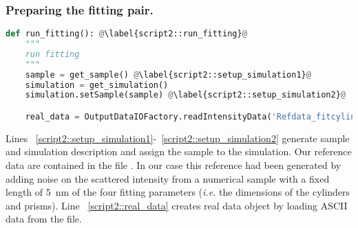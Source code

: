 \subsubsection*{Preparing the fitting pair.}
\begin{lstlisting}[language=python, style=eclipseboxed, firstnumber=45]
def run_fitting(): @\label{script2::run_fitting}@
    """
    run fitting
    """
    sample = get_sample() @\label{script2::setup_simulation1}@
    simulation = get_simulation()
    simulation.setSample(sample) @\label{script2::setup_simulation2}@

    real_data = OutputDataIOFactory.readIntensityData('Refdata_fitcylinderprisms.txt') @\label{script2::real_data}@
\end{lstlisting}
Lines ~\ref{script2::setup_simulation1}-~\ref{script2::setup_simulation2} generate
sample and simulation description and assign the sample to the simulation.
Our reference data are contained in the file .
 In our case this reference had been generated by adding noise
on the scattered intensity from a numerical sample with a fixed length of 5~nm of the four fitting
parameters (\textit{i.e.} the dimensions of the cylinders and prisms).
Line ~\ref{script2::real_data} creates real data object by loading ASCII data from the file.


